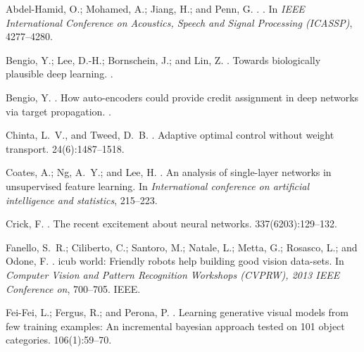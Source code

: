 \documentclass[letterpaper]{article}
\begin{document}
\begin{thebibliography}{}

Abdel-Hamid, O.; Mohamed, A.; Jiang, H.; and Penn, G.
.
.
\newblock In {\em IEEE International Conference on Acoustics, Speech and Signal
  Processing (ICASSP)},  4277--4280.

Bengio, Y.; Lee, D.-H.; Bornschein, J.; and Lin, Z.
.
\newblock Towards biologically plausible deep learning.
.

Bengio, Y.
.
\newblock How auto-encoders could provide credit assignment in deep networks
  via target propagation.
.

Chinta, L.~V., and Tweed, D.~B.
.
\newblock Adaptive optimal control without weight transport.
 24(6):1487--1518.

Coates, A.; Ng, A.~Y.; and Lee, H.
.
\newblock An analysis of single-layer networks in unsupervised feature
  learning.
\newblock In {\em International conference on artificial intelligence and
  statistics},  215--223.

Crick, F.
.
\newblock The recent excitement about neural networks.
 337(6203):129--132.

Fanello, S.~R.; Ciliberto, C.; Santoro, M.; Natale, L.; Metta, G.; Rosasco, L.;
  and Odone, F.
.
\newblock icub world: Friendly robots help building good vision data-sets.
\newblock In {\em Computer Vision and Pattern Recognition Workshops (CVPRW),
  2013 IEEE Conference on},  700--705.
\newblock IEEE.

Fei-Fei, L.; Fergus, R.; and Perona, P.
.
\newblock Learning generative visual models from few training examples: An
  incremental bayesian approach tested on 101 object categories.
 106(1):59--70.


\end{thebibliography}
\end{document}
